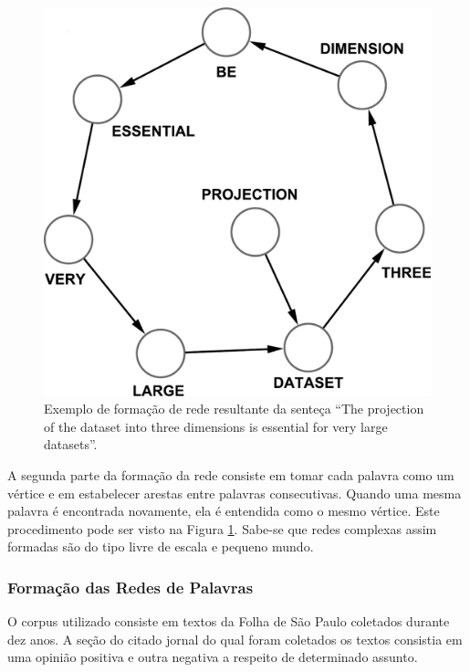 \documentclass[12pt]{article}
\begin{document}
\begin{figure}[t]
\begin{center}
\includegraphics[scale=.27]{data}
\end{center}
%
%
\caption{Exemplo de formação de rede resultante da senteça ``The projection of the dataset into three dimensions is essential for very large datasets''.}
\label{fig:r0}       %
\end{figure}

 A segunda parte da formação da rede consiste em tomar cada palavra como um vértice e em estabelecer arestas entre palavras consecutivas. Quando uma mesma palavra é encontrada novamente, ela é entendida como o mesmo vértice. Este procedimento pode ser visto na Figura \ref{fig:r0}. Sabe-se que redes complexas assim formadas são do tipo livre de escala e pequeno mundo.


\subsubsection{Formação das Redes de Palavras}
O corpus utilizado consiste em textos da Folha de São Paulo coletados durante dez anos. A seção do citado jornal do qual foram coletados os textos consistia em uma opinião positiva e outra negativa a respeito de determinado assunto.
\end{document}
